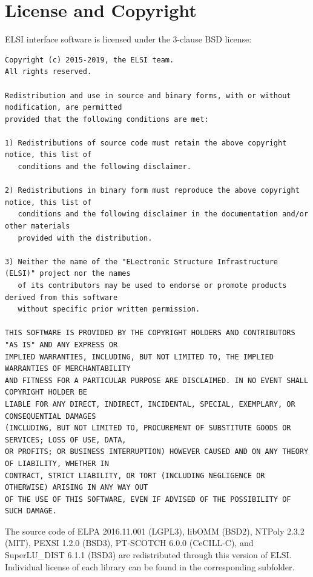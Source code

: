 \documentclass{report}
\begin{document}



\chapter*{License and Copyright}
ELSI interface software is licensed under the 3-clause BSD license:

\begin{tcolorbox}
\begin{Verbatim}
Copyright (c) 2015-2019, the ELSI team.
All rights reserved.

Redistribution and use in source and binary forms, with or without modification, are permitted
provided that the following conditions are met:

1) Redistributions of source code must retain the above copyright notice, this list of
   conditions and the following disclaimer.

2) Redistributions in binary form must reproduce the above copyright notice, this list of
   conditions and the following disclaimer in the documentation and/or other materials
   provided with the distribution.

3) Neither the name of the "ELectronic Structure Infrastructure (ELSI)" project nor the names
   of its contributors may be used to endorse or promote products derived from this software
   without specific prior written permission.

THIS SOFTWARE IS PROVIDED BY THE COPYRIGHT HOLDERS AND CONTRIBUTORS "AS IS" AND ANY EXPRESS OR
IMPLIED WARRANTIES, INCLUDING, BUT NOT LIMITED TO, THE IMPLIED WARRANTIES OF MERCHANTABILITY
AND FITNESS FOR A PARTICULAR PURPOSE ARE DISCLAIMED. IN NO EVENT SHALL COPYRIGHT HOLDER BE
LIABLE FOR ANY DIRECT, INDIRECT, INCIDENTAL, SPECIAL, EXEMPLARY, OR CONSEQUENTIAL DAMAGES
(INCLUDING, BUT NOT LIMITED TO, PROCUREMENT OF SUBSTITUTE GOODS OR SERVICES; LOSS OF USE, DATA,
OR PROFITS; OR BUSINESS INTERRUPTION) HOWEVER CAUSED AND ON ANY THEORY OF LIABILITY, WHETHER IN
CONTRACT, STRICT LIABILITY, OR TORT (INCLUDING NEGLIGENCE OR OTHERWISE) ARISING IN ANY WAY OUT
OF THE USE OF THIS SOFTWARE, EVEN IF ADVISED OF THE POSSIBILITY OF SUCH DAMAGE.
\end{Verbatim}
\end{tcolorbox}

The source code of ELPA 2016.11.001 (LGPL3), libOMM (BSD2), NTPoly 2.3.2 (MIT), PEXSI 1.2.0 (BSD3), PT-SCOTCH 6.0.0 (CeCILL-C), and SuperLU\_DIST 6.1.1 (BSD3) are redistributed through this version of ELSI. Individual license of each library can be found in the corresponding subfolder.
\end{document}
